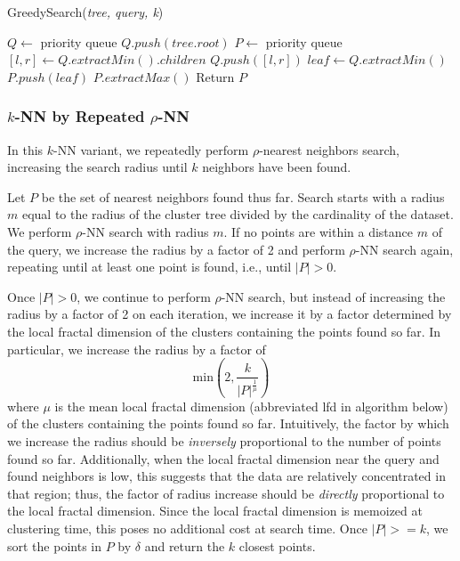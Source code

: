 \begin{algorithm} 
\caption{GreedySearch(\emph{tree, query, k})} 
\label{alg:greedy_search} 
\begin{algorithmic}[3]
    \STATE $Q \leftarrow$ priority queue
    \STATE $Q.push(tree.root)$
    \STATE $P \leftarrow$ priority queue
            \STATE $[l, r] \leftarrow Q.extractMin().children$
            \STATE $Q.push([l, r])$
        \ENDWHILE
        \STATE $leaf \leftarrow Q.extractMin()$
        \STATE $P.push(leaf)$
            \STATE $P.extractMax()$
        \ENDWHILE
    \ENDWHILE
    \STATE Return $P$
\end{algorithmic}
\end{algorithm}


\subsubsection{$k$-NN by Repeated $\rho$-NN}
\label{subsubsec:methods:knn-search:repeated-rnn}
In this $k$-NN variant, we repeatedly perform
$\rho$-nearest neighbors search, increasing the search radius until $k$ neighbors
have been found.

Let $P$ be the set of nearest neighbors found thus far.
Search starts with a radius $m$ equal to the radius of the cluster tree divided by
the cardinality of the dataset. We perform $\rho$-NN search with radius $m$. 
If no points are within a distance $m$ of the query, we increase the radius by a factor of 
2 and perform $\rho$-NN search again, repeating until at least one point is found, i.e., 
until $|P| > 0$.

Once $|P| > 0$, we continue to perform $\rho$-NN search, but instead of 
increasing the radius by a factor of 2 on each iteration, we increase it by a factor determined 
by the local fractal dimension of the clusters containing the points found so far. In particular, 
we increase the radius by a factor of 
$$\text{min}\left(2, \frac{k}{|P|^{\frac{1}{\mu}}}\right)$$
where $\mu$ is the mean local fractal dimension (abbreviated lfd in algorithm below) of the clusters containing the points found so far.
Intuitively, the factor by which we increase the radius should be \emph{inversely} proportional to the number of points found so far. 
Additionally, when the local fractal dimension near the query and found neighbors is low, this suggests that the data 
are relatively concentrated in that region; thus, the factor of radius increase should be \emph{directly} proportional to the 
local fractal dimension. Since the local fractal dimension is memoized at clustering time, this poses no additional cost at search time.
Once $|P| >= k$, we sort the points in $P$ by $\delta$ and return the $k$ closest points.

